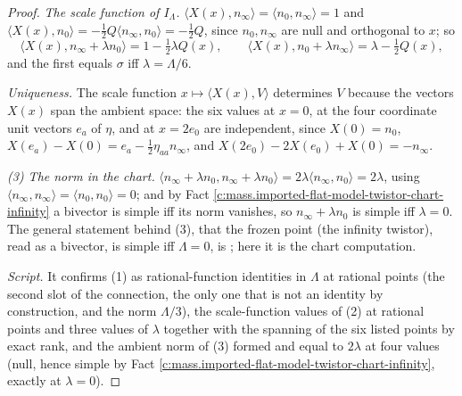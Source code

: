 \documentclass[11pt]{article}
\theoremstyle{definition}
\theoremstyle{plain}
\providecommand{\ip}{}\renewcommand{\ip}[2]{\langle #1, #2\rangle}
\begin{document}
\begin{proof}
\emph{The scale function of $I_{\Lambda}$.} $\ip{X(x)}{n_{\infty}} = \ip{n_{0}}{n_{\infty}} = 1$ and $\ip{X(x)}{n_{0}} = -\tfrac12 Q\ip{n_{\infty}}{n_{0}} = -\tfrac12 Q$, since $n_{0}, n_{\infty}$ are null and orthogonal to $x$; so
\[
\ip{X(x)}{n_{\infty} + \lambda n_{0}} = 1 - \tfrac12\lambda Q(x), \qquad \ip{X(x)}{n_{0} + \lambda n_{\infty}} = \lambda - \tfrac12 Q(x),
\]
and the first equals $\sigma$ iff $\lambda = \Lambda/6$.

\emph{Uniqueness.} The scale function $x \mapsto \ip{X(x)}{V}$ determines $V$ because the vectors $X(x)$ span the ambient space: the six values at $x = 0$, at the four coordinate unit vectors $e_{a}$ of $\eta$, and at $x = 2e_{0}$ are independent, since $X(0) = n_{0}$, $X(e_{a}) - X(0) = e_{a} - \tfrac12\eta_{aa}n_{\infty}$, and $X(2e_{0}) - 2X(e_{0}) + X(0) = -n_{\infty}$.

\emph{(3) The norm in the chart.} $\ip{n_{\infty} + \lambda n_{0}}{n_{\infty} + \lambda n_{0}} = 2\lambda\ip{n_{\infty}}{n_{0}} = 2\lambda$, using $\ip{n_{\infty}}{n_{\infty}} = \ip{n_{0}}{n_{0}} = 0$; and by Fact \ref{c:mass.imported-flat-model-twistor-chart-infinity} a bivector is simple iff its norm vanishes, so $n_{\infty} + \lambda n_{0}$ is simple iff $\lambda = 0$. The general statement behind (3), that the frozen point (the infinity twistor), read as a bivector, is simple iff $\Lambda = 0$, is \cite[Cor.~4.8]{ButlerT9}; here it is the chart computation.

\emph{Script.} It confirms (1) as rational-function identities in $\Lambda$ at rational points (the second slot of the connection, the only one that is not an identity by construction, and the norm $\Lambda/3$), the scale-function values of (2) at rational points and three values of $\lambda$ together with the spanning of the six listed points by exact rank, and the ambient norm of (3) formed and equal to $2\lambda$ at four values (null, hence simple by Fact \ref{c:mass.imported-flat-model-twistor-chart-infinity}, exactly at $\lambda = 0$).

\end{proof}
\end{document}
